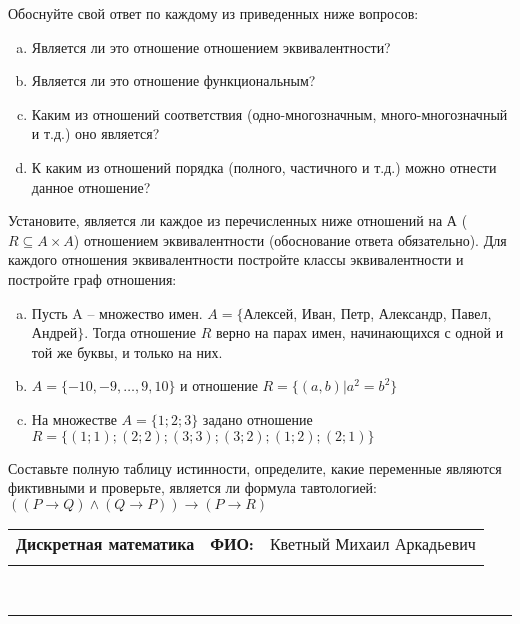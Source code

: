 \documentclass[10pt]{exam}
\newcommand{\class}{Дискретная математика}
\newcommand{\examdate}{}
\begin{document}
\begin{questions}
Обоснуйте свой ответ по каждому из приведенных ниже вопросов:
\begin{enumerate} [a)]\setcounter{enumi}{0}
    \item Является ли это отношение отношением эквивалентности?
    \item Является ли это отношение функциональным?
    \item Каким из отношений соответствия (одно-многозначным, много-многозначный и т.д.) оно является?
    \item К каким из отношений порядка (полного, частичного и т.д.) можно отнести данное отношение?
\end{enumerate}
\question
Установите, является ли каждое из перечисленных ниже отношений на А ($R \subseteq A \times A$) отношением эквивалентности (обоснование ответа обязательно). Для каждого отношения эквивалентности постройте классы 
эквивалентности и постройте граф отношения:
\begin{enumerate} [a)]\setcounter{enumi}{0}
\item Пусть A – множество имен. $A = \{ $Алексей, Иван, Петр, Александр, Павел, Андрей$ \}$. Тогда отношение $R$ верно на парах имен, начинающихся с одной и той же буквы, и только на них.
\item $A = \{-10, -9, … , 9, 10\}$ и отношение $ R = \{(a,b)|a^{2} = b^{2}\}$
\item На множестве $A = \{1; 2; 3\}$ задано отношение $R = \{(1; 1); (2; 2); (3; 3); (3; 2); (1; 2); (2; 1)\}$
\end{enumerate}\question Составьте полную таблицу истинности, определите, какие переменные являются фиктивными и проверьте, является ли формула тавтологией:
$(( P \rightarrow Q) \land (Q \rightarrow P)) \rightarrow (P \rightarrow R)$

\end{questions}
\newpage
\begin{flushright}
\begin{tabular}{p{2.8in} r l}
\textbf{\class} & \textbf{ФИО:} &Кветный Михаил Аркадьевич
\\

\textbf{\examdate} &&\\
\end{tabular}\\
\end{flushright}
\rule[1ex]{\textwidth}{.1pt}
\end{document}
